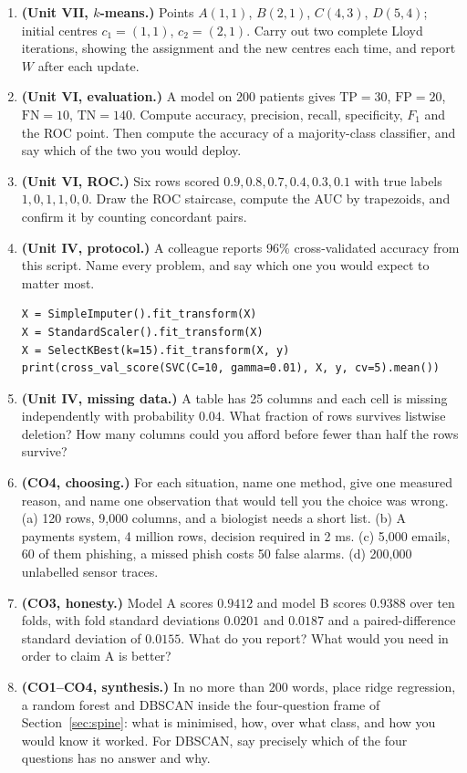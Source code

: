 \documentclass[11pt]{article}
\begin{document}
\begin{enumerate}[leftmargin=*, itemsep=0.45em]
  \item \textbf{(Unit VII, $k$-means.)} Points $A(1,1)$, $B(2,1)$, $C(4,3)$,
    $D(5,4)$; initial centres $c_1 = (1,1)$, $c_2 = (2,1)$. Carry out two
    complete Lloyd iterations, showing the assignment and the new centres
    each time, and report $W$ after each update.
  \item \textbf{(Unit VI, evaluation.)} A model on 200 patients gives
    $\mathrm{TP} = 30$, $\mathrm{FP} = 20$, $\mathrm{FN} = 10$,
    $\mathrm{TN} = 140$. Compute accuracy, precision, recall, specificity,
    $F_1$ and the ROC point. Then compute the accuracy of a
    majority-class classifier, and say which of the two you would deploy.
  \item \textbf{(Unit VI, ROC.)} Six rows scored $0.9, 0.8, 0.7, 0.4, 0.3,
    0.1$ with true labels $1, 0, 1, 1, 0, 0$. Draw the ROC staircase, compute
    the AUC by trapezoids, and confirm it by counting concordant pairs.
  \item \textbf{(Unit IV, protocol.)} A colleague reports $96\%$
    cross-validated accuracy from this script. Name every problem, and say
    which one you would expect to matter most.
\begin{lstlisting}
X = SimpleImputer().fit_transform(X)
X = StandardScaler().fit_transform(X)
X = SelectKBest(k=15).fit_transform(X, y)
print(cross_val_score(SVC(C=10, gamma=0.01), X, y, cv=5).mean())
\end{lstlisting}
  \item \textbf{(Unit IV, missing data.)} A table has 25 columns and each
    cell is missing independently with probability $0.04$. What fraction of
    rows survives listwise deletion? How many columns could you afford before
    fewer than half the rows survive?
  \item \textbf{(CO4, choosing.)} For each situation, name one method, give
    one measured reason, and name one observation that would tell you the
    choice was wrong. (a) 120 rows, 9{,}000 columns, and a biologist needs a
    short list. (b) A payments system, 4 million rows, decision required in
    2 ms. (c) 5{,}000 emails, 60 of them phishing, a missed phish costs 50
    false alarms. (d) 200{,}000 unlabelled sensor traces.
  \item \textbf{(CO3, honesty.)} Model A scores $0.9412$ and model B scores
    $0.9388$ over ten folds, with fold standard deviations $0.0201$ and
    $0.0187$ and a paired-difference standard deviation of $0.0155$. What do
    you report? What would you need in order to claim A is better?
  \item \textbf{(CO1--CO4, synthesis.)} In no more than 200 words, place
    ridge regression, a random forest and DBSCAN inside the four-question
    frame of Section~\ref{sec:spine}: what is minimised, how, over what
    class, and how you would know it worked. For DBSCAN, say precisely which
    of the four questions has no answer and why.
\end{enumerate}
\end{document}
